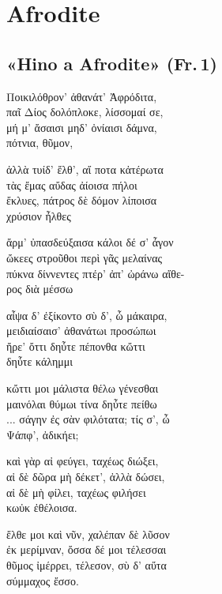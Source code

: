 \chapter{Afrodite}

\section{«Hino a Afrodite» (Fr.\,1)} 

\begin{gkverse}
Ποικιλόθρον’ ἀθανάτ’ Ἀφρόδιτα,\\
παῖ Δίος δολόπλοκε, λίσσομαί σε,\\
μή μ’ ἄσαισι μηδ’ ὀνίαισι δάμνα,\\
	πότνια, θῦμον,

ἀλλὰ τυίδ’ ἔλθ’, αἴ ποτα κἀτέρωτα\\
τὰς ἔμας αὔδας ἀίοισα πήλοι\\
ἔκλυες, πάτρος δὲ δόμον λίποισα\\
	χρύσιον ἦλθες

ἄρμ’ ὐπασδεύξαισα κάλοι δέ σ’ ἆγον\\
ὤκεες στροῦθοι περὶ γᾶς μελαίνας\\
πύκνα δίννεντες πτέρ’ ἀπ’ ὠράνω αἴθε-\\
ρος διὰ μέσσω

αἶψα δ’ ἐξίκοντο σὺ δ’, ὦ μάκαιρα,\\
μειδιαίσαισ’ ἀθανάτωι προσώπωι\\
ἤρε’ ὄττι δηὖτε πέπονθα κὤττι\\
δηὖτε κάλημμι

κὤττι μοι μάλιστα θέλω γένεσθαι\\
μαινόλαι θύμωι τίνα δηὖτε πείθω\\
... σάγην ἐς σὰν φιλότατα; τίς σ’, ὦ\\
Ψάπφ’, ἀδικήει;

καὶ γὰρ αἰ φεύγει, ταχέως διώξει,\\
αἰ δὲ δῶρα μὴ δέκετ’, ἀλλὰ δώσει,\\
αἰ δὲ μὴ φίλει, ταχέως φιλήσει\\
κωὐκ ἐθέλοισα.

ἔλθε μοι καὶ νῦν, χαλέπαν δὲ λῦσον\\
ἐκ μερίμναν, ὄσσα δέ μοι τέλεσσαι\\
θῦμος ἰμέρρει, τέλεσον, σὺ δ’ αὔτα\\
σύμμαχος ἔσσο. 
\end{gkverse}



